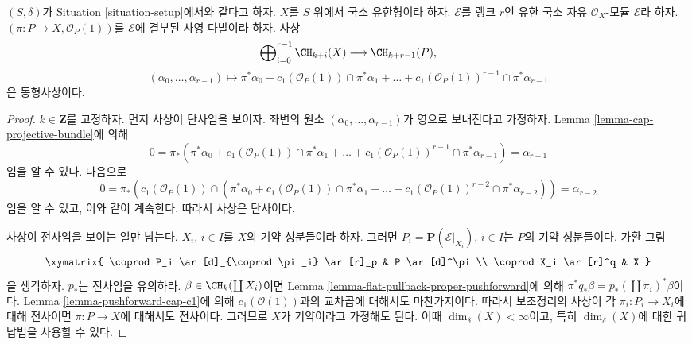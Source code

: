 \begin{lemma}[사영공간 다발 공식]
\label{lemma-chow-ring-projective-bundle}
$(S, \delta)$가 Situation \ref{situation-setup}에서와 같다고 하자.
$X$를 $S$ 위에서 국소 유한형이라 하자. $\mathcal{E}$를 랭크 $r$인
유한 국소 자유 $\mathcal{O}_X$-모듈 $\mathcal{E}$라 하자.
$(\pi : P \to X, \mathcal{O}_P(1))$를 $\mathcal{E}$에 결부된 사영
다발이라 하자. 사상
$$
\bigoplus\nolimits_{i = 0}^{r - 1}
\CH_{k + i}(X)
\longrightarrow
\CH_{k + r - 1}(P),
$$
$$
(\alpha_0, \ldots, \alpha_{r-1})
\longmapsto
\pi^*\alpha_0 +
c_1(\mathcal{O}_P(1)) \cap \pi^*\alpha_1
+ \ldots +
c_1(\mathcal{O}_P(1))^{r - 1} \cap \pi^*\alpha_{r-1}
$$
은 동형사상이다.
\end{lemma}

\begin{proof}
$k \in \mathbf{Z}$를 고정하자. 먼저 사상이 단사임을 보이자. 좌변의
원소 $(\alpha_0, \ldots, \alpha_{r - 1})$가 영으로 보내진다고 가정하자.
Lemma \ref{lemma-cap-projective-bundle}에 의해
$$
0 = \pi_*(\pi^*\alpha_0 +
c_1(\mathcal{O}_P(1)) \cap \pi^*\alpha_1
+ \ldots +
c_1(\mathcal{O}_P(1))^{r - 1} \cap \pi^*\alpha_{r-1})
= \alpha_{r - 1}
$$
임을 알 수 있다. 다음으로
$$
0 = \pi_*(c_1(\mathcal{O}_P(1)) \cap (\pi^*\alpha_0 +
c_1(\mathcal{O}_P(1)) \cap \pi^*\alpha_1
+ \ldots +
c_1(\mathcal{O}_P(1))^{r - 2} \cap \pi^*\alpha_{r - 2}))
= \alpha_{r - 2}
$$
임을 알 수 있고, 이와 같이 계속한다. 따라서 사상은 단사이다.

\medskip\noindent
사상이 전사임을 보이는 일만 남는다. $X_i$, $i \in I$를 $X$의 기약
성분들이라 하자. 그러면
$P_i = \mathbf{P}(\mathcal{E}|_{X_i})$, $i \in I$는 $P$의 기약
성분들이다. 가환 그림
$$
\xymatrix{
\coprod P_i \ar[d]_{\coprod \pi_i} \ar[r]_p & P \ar[d]^\pi \\
\coprod X_i \ar[r]^q & X
}
$$
을 생각하자. $p_*$는 전사임을 유의하라.
$\beta \in \CH_k(\coprod X_i)$이면 Lemma
\ref{lemma-flat-pullback-proper-pushforward}에 의해
$\pi^* q_* \beta = p_*(\coprod \pi_i)^* \beta$이다. Lemma
\ref{lemma-pushforward-cap-c1}에 의해 $c_1(\mathcal{O}(1))$과의
교차곱에 대해서도 마찬가지이다. 따라서 보조정리의 사상이 각
$\pi_i : P_i \to X_i$에 대해 전사이면 $\pi : P \to X$에 대해서도
전사이다. 그러므로 $X$가 기약이라고 가정해도 된다. 이때
$\dim_\delta(X) < \infty$이고, 특히 $\dim_\delta(X)$에 대한 귀납법을
사용할 수 있다.


\end{proof}
